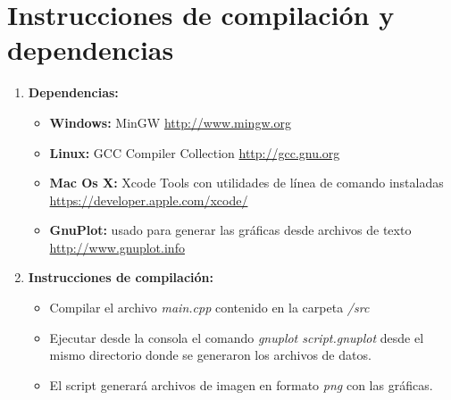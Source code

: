 \section{Instrucciones de compilación y dependencias}
\begin{enumerate}
	\item \textbf{Dependencias:}
		\begin{itemize}
			\item \textbf{Windows:}  MinGW  \url{http://www.mingw.org}
			\item \textbf{Linux:} GCC Compiler Collection  \url{http://gcc.gnu.org}
			\item \textbf{Mac Os X:} Xcode Tools con utilidades de línea de comando instaladas  							\url{https://developer.apple.com/xcode/}
			\item \textbf{GnuPlot:}  usado para generar las gráficas desde archivos de texto 								\url{http://www.gnuplot.info}
		\end{itemize}
	\item \textbf{Instrucciones de compilación:}
			\begin{itemize}
			\item Compilar el archivo \textit{main.cpp} contenido en la carpeta \textit{/src}
			\item Ejecutar desde la consola el comando \textit{gnuplot script.gnuplot} desde el 					mismo directorio donde se generaron los archivos de datos.
			\item El script generará archivos de imagen en formato \textit{png} con las gráficas.
			\end{itemize}
\end{enumerate}

